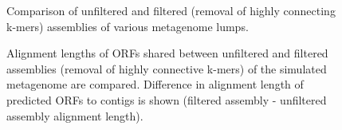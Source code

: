 \documentclass[11pt]{article} %
\begin{document}
\begin{figure}
\caption{Comparison of unfiltered and filtered (removal of highly connecting k-mers) assemblies of various metagenome lumps.}
\end{figure}

\begin{figure}
\caption{Alignment lengths of ORFs shared between unfiltered and filtered assemblies (removal of highly connective k-mers) of the simulated metagenome are compared.  Difference in alignment length of predicted ORFs to contigs is shown (filtered assembly - unfiltered assembly alignment length).}
\end{figure}
\end{document}

